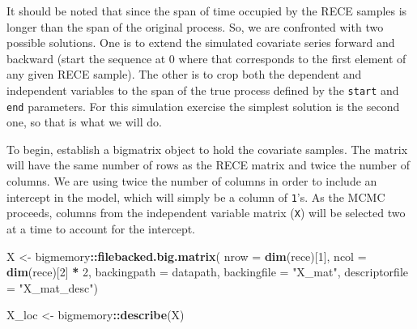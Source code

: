 \documentclass[]{article}
\newenvironment{Shaded}{\begin{snugshade}}{\end{snugshade}}
\newcommand{\KeywordTok}[1]{\textcolor[rgb]{0.13,0.29,0.53}{\textbf{#1}}}
\newcommand{\DataTypeTok}[1]{\textcolor[rgb]{0.13,0.29,0.53}{#1}}
\newcommand{\DecValTok}[1]{\textcolor[rgb]{0.00,0.00,0.81}{#1}}
\newcommand{\StringTok}[1]{\textcolor[rgb]{0.31,0.60,0.02}{#1}}
\newcommand{\OperatorTok}[1]{\textcolor[rgb]{0.81,0.36,0.00}{\textbf{#1}}}
\newcommand{\NormalTok}[1]{#1}
\begin{document}
It should be noted that since the span of time occupied by the RECE
samples is longer than the span of the original process. So, we are
confronted with two possible solutions. One is to extend the simulated
covariate series forward and backward (start the sequence at 0 where
that corresponds to the first element of any given RECE sample). The
other is to crop both the dependent and independent variables to the
span of the true process defined by the \texttt{start} and \texttt{end}
parameters. For this simulation exercise the simplest solution is the
second one, so that is what we will do.

To begin, establish a bigmatrix object to hold the covariate samples.
The matrix will have the same number of rows as the RECE matrix and
twice the number of columns. We are using twice the number of columns in
order to include an intercept in the model, which will simply be a
column of \texttt{1}'s. As the MCMC proceeds, columns from the
independent variable matrix (\texttt{X}) will be selected two at a time
to account for the intercept.

\begin{Shaded}
\begin{Highlighting}[]
\NormalTok{X <-}\StringTok{ }\NormalTok{bigmemory}\OperatorTok{::}\KeywordTok{filebacked.big.matrix}\NormalTok{(}
                    \DataTypeTok{nrow =} \KeywordTok{dim}\NormalTok{(rece)[}\DecValTok{1}\NormalTok{],}
                    \DataTypeTok{ncol =} \KeywordTok{dim}\NormalTok{(rece)[}\DecValTok{2}\NormalTok{] }\OperatorTok{*}\StringTok{ }\DecValTok{2}\NormalTok{,}
                    \DataTypeTok{backingpath =}\NormalTok{ datapath,}
                    \DataTypeTok{backingfile =} \StringTok{"X_mat"}\NormalTok{,}
                    \DataTypeTok{descriptorfile =} \StringTok{"X_mat_desc"}\NormalTok{)}

\NormalTok{X_loc <-}\StringTok{ }\NormalTok{bigmemory}\OperatorTok{::}\KeywordTok{describe}\NormalTok{(X)}
\end{Highlighting}
\end{Shaded}
\end{document}
